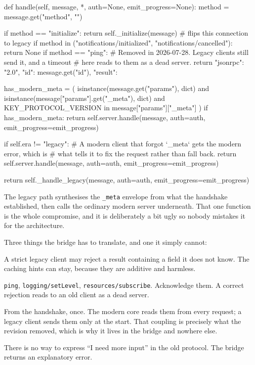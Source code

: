 \begin{py}
def handle(self, message, *, auth=None, emit_progress=None):
    method = message.get("method", "")

    if method == "initialize":
        return self._initialize(message)        # flips this connection to legacy
    if method in ("notifications/initialized", "notifications/cancelled"):
        return None
    if method == "ping":
        # Removed in 2026-07-28. Legacy clients still send it, and a timeout
        # here reads to them as a dead server.
        return {"jsonrpc": "2.0", "id": message.get("id"), "result": {}}

    has_modern_meta = (
        isinstance(message.get("params"), dict)
        and isinstance(message["params"].get("_meta"), dict)
        and KEY_PROTOCOL_VERSION in message["params"]["_meta"]
    )
    if has_modern_meta:
        return self.server.handle(message, auth=auth,
                                  emit_progress=emit_progress)

    if self.era != "legacy":
        # A modern client that forgot `_meta` gets the modern error, which is
        # what tells it to fix the request rather than fall back.
        return self.server.handle(message, auth=auth,
                                  emit_progress=emit_progress)

    return self._handle_legacy(message, auth=auth,
                               emit_progress=emit_progress)
\end{py}

The legacy path synthesises the \texttt{\_meta} envelope from what the handshake
established, then calls the ordinary modern server underneath. That one function
is the whole compromise, and it is deliberately a bit ugly so nobody mistakes it
for the architecture.

Three things the bridge has to translate, and one it simply cannot:

\begin{description}[leftmargin=1.4em, style=nextline, itemsep=4pt]
\item[Strip \texttt{resultType}] A strict legacy client may reject a result
containing a field it does not know. The caching hints can stay, because they
are additive and harmless.
\item[Answer removed methods] \texttt{ping}, \texttt{logging/setLevel},
\texttt{resources/subscribe}. Acknowledge them. A correct rejection reads to an old client as a dead server.
\item[Synthesise capabilities] From the handshake, once. The modern core reads
them from every request; a legacy client sends them only at the start. That
coupling is precisely what the revision removed, which is why it lives in the
bridge and nowhere else.
\item[Elicitation, which has no legacy equivalent] There is no way to express
``I need more input'' in the old protocol. The bridge returns an explanatory error.
\end{description}

